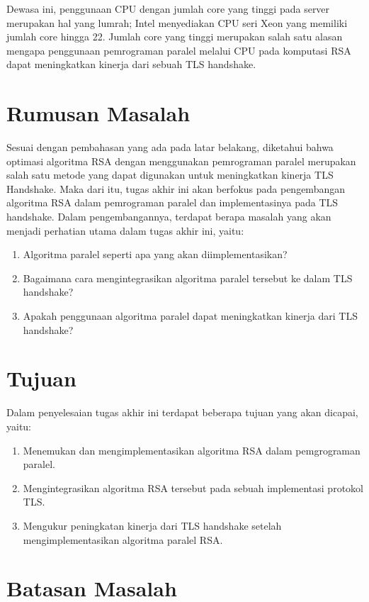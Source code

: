 Dewasa ini, penggunaan CPU dengan jumlah core yang tinggi pada server merupakan hal yang lumrah; Intel menyediakan CPU seri Xeon yang memiliki jumlah core hingga 22. Jumlah core yang tinggi merupakan salah satu alasan mengapa penggunaan pemrograman paralel melalui CPU pada komputasi RSA dapat meningkatkan kinerja dari sebuah TLS handshake.


\section{Rumusan Masalah}

Sesuai dengan pembahasan yang ada pada latar belakang, diketahui bahwa optimasi algoritma RSA dengan menggunakan pemrograman paralel merupakan salah satu metode yang dapat digunakan untuk meningkatkan kinerja TLS Handshake. Maka dari itu, tugas akhir ini akan berfokus pada pengembangan algoritma RSA dalam pemrograman paralel dan implementasinya pada TLS handshake. Dalam pengembangannya, terdapat berapa masalah yang akan menjadi perhatian utama dalam tugas akhir ini, yaitu:

\begin{enumerate}
  \item Algoritma paralel seperti apa yang akan diimplementasikan?
  \item Bagaimana cara mengintegrasikan algoritma paralel tersebut ke dalam TLS handshake?
  \item Apakah penggunaan algoritma paralel dapat meningkatkan kinerja dari TLS handshake?
\end{enumerate}

\section{Tujuan}

Dalam penyelesaian tugas akhir ini terdapat beberapa tujuan yang akan dicapai, yaitu:
\begin{enumerate}
  \item Menemukan dan mengimplementasikan algoritma RSA dalam pemgrograman paralel.
  \item Mengintegrasikan algoritma RSA tersebut pada sebuah implementasi protokol TLS.
  \item Mengukur peningkatan kinerja dari TLS handshake setelah mengimplementasikan algoritma paralel RSA.
\end{enumerate}

\section{Batasan Masalah}

